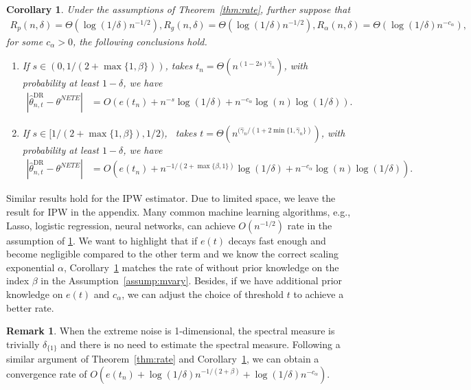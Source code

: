 \documentclass[12pt]{article}
\theoremstyle{plain}
\newtheorem{corollary}[theorem]{Corollary}
\theoremstyle{definition}
\newtheorem{remark}[theorem]{Remark}
\begin{document}
\begin{corollary}\label{cor:rate}
Under the assumptions of Theorem~\ref{thm:rate}, further
  suppose that
  \begin{align*}
    R_p (n, \delta) = \Theta (\log (1 / \delta) n^{- 1 / 2}) , R_g (n, \delta) = \Theta (\log (1 / \delta) n^{- 1 / 2}), R_\alpha (n, \delta) = \Theta( \log(1/\delta) n^{-c_\alpha}),
  \end{align*}
  for some $c_\alpha > 0 $, the following conclusions hold.
  \begin{enumerate}
    \item If $s \in (0, 1 / (2 + \max \{1, \beta\}))$, takes $t_n = \Theta (n^{
    (1 - 2 s) \hat{\gamma}_{n}})$, with probability at least $1 - \delta$,
    we have
    \begin{align*}
      | {{\widehat{\theta }_{n, t}^{\text{DR} }} }   - \theta^{NETE} | & = O
      (e (t_n) + n^{- s} \log (1 / \delta) +  n^{-c_\alpha} \log(n)\log (1 / \delta)) .
    \end{align*}
    \item If $s \in [1 / (2 + \max \{1, \beta\}), 1 / 2)$, \ takes $t = \Theta
    (n^{(\hat{\gamma}_{n} / (1 + 2 \min \{1, \hat{\gamma}_{n} \})})$,
    with probability at least $1 - \delta$, we have
    \begin{align*}
      | {{\widehat{\theta }_{n, t}^{\text{DR} }} }   - \theta^{NETE} | & = O
      (e (t_n) + n^{- 1 / (2 + \max \{\beta, 1\})} \log (1 / \delta) +  n^{-c_\alpha} \log(n)\log (1 / \delta)) .
    \end{align*}
  \end{enumerate}
\end{corollary}

Similar results hold for the IPW estimator. Due to limited space, we leave the result for IPW in the appendix. Many common machine learning algorithms, e.g., Lasso, logistic regression, neural networks, can achieve $O(n^{-1/2})$ rate in the assumption of \cref{cor:rate}.  We want to highlight that if $e(t)$ decays fast enough and become negligible compared to the other term and we know the correct scaling exponential $\alpha$, Corollary~\ref{cor:rate} matches the rate of {\cite[Theorem 3.1]{zhang2023wasserstein}} without prior knowledge on the index $\beta$ in the Assumption~\ref{assump:mvary}. Besides, if we have additional prior knowledge on $e(t)$ and $c_\alpha$, we can adjust the choice of threshold $t$ to achieve a better rate. 

\begin{remark}
  When the extreme noise is 1-dimensional, the spectral measure is trivially $\delta_{\{1\}}$ and there is no need to estimate the spectral measure. Following a similar argument of  Theorem~\ref{thm:rate} and 
  Corollary~\ref{cor:rate}, we can obtain a convergence rate of $O (e
  (t_n) + \log(1/\delta)n^{- 1 / (2 + \beta)} + \log(1/\delta) n^{-c_\alpha} )$.
\end{remark}
\end{document}
